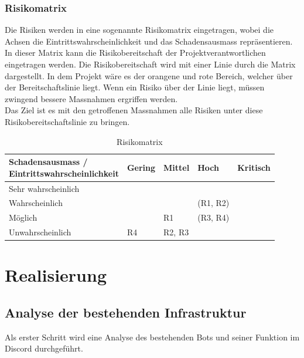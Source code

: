 \documentclass[a4paper, table]{article}
\begin{document}
\subsubsection{Risikomatrix}
Die Risiken werden in eine sogenannte Risikomatrix eingetragen, wobei die Achsen die Eintrittswahrscheinlichkeit und das Schadensausmass repräsentieren.
In dieser Matrix kann die Risikobereitschaft der Projektverantwortlichen eingetragen werden.
Die Risikobereitschaft wird mit einer Linie durch die Matrix dargestellt.
In dem Projekt wäre es der orangene und rote Bereich, welcher über der Bereitschaftslinie liegt.
Wenn ein Risiko über der Linie liegt, müssen zwingend bessere Massnahmen ergriffen werden.\\
Das Ziel ist es mit den getroffenen Massnahmen alle Risiken unter diese Risikobereitschaftslinie zu bringen.

\begin{table}[h]
    \centering
    \begin{tabular}{|l|p{2cm}|p{2cm}|p{2cm}|p{2cm}|}
        \hline
        \shortstack[c]{Schadensausmass / \\ Eintrittswahrscheinlichkeit} & Gering & Mittel & Hoch & Kritisch \\[10pt]
        \hline
        Sehr wahrscheinlich & \cellcolor{yellow!50} & \cellcolor{orange!50} & \cellcolor{red!50} & \cellcolor{red!50} \\[10pt]
        \hline
        Wahrscheinlich & \cellcolor{yellow!50} & \cellcolor{yellow!50}& \cellcolor{orange!50}(R1, R2) & \cellcolor{red!50} \\[10pt]
        \hline
        Möglich & \cellcolor{green!50} & \cellcolor{yellow!50}R1 & \cellcolor{yellow!50}(R3, R4) & \cellcolor{orange!50} \\[10pt]
        \hline
        Unwahrscheinlich & \cellcolor{green!50}R4 & \cellcolor{green!50}R2, R3 & \cellcolor{yellow!50} & \cellcolor{yellow!50} \\[10pt]
        \hline
    \end{tabular}
    \caption{Risikomatrix}
    \label{tab: Riskmatrix}
\end{table}

\clearpage
\section{Realisierung}

\subsection{Analyse der bestehenden Infrastruktur}
Als erster Schritt wird eine Analyse des bestehenden Bots und seiner Funktion im Discord durchgef\"uhrt.
\end{document}
